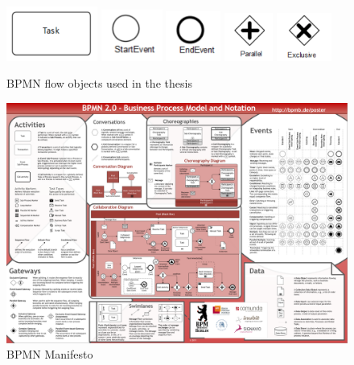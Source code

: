 \begin{figure}[!ht]
    \centering
    \includegraphics[width=30mm]{images/bpmn_task.png}
    \includegraphics[width=20mm]{images/bpmn_start_event.png}
    \includegraphics[width=18mm]{images/bpmn_end_event.png}
    \includegraphics[width=16mm]{images/bpmn_parallel.png}
    \includegraphics[width=18mm]{images/bpmn_exclusive.png}
    \caption{BPMN flow objects used in the thesis}
    \label{images:bpmn_flow_obj}
\end{figure}


\begin{figure}[!ht]
    \centering
\includegraphics[width=\textwidth]{images/bpmn_manifesto.png}
    \caption{BPMN Manifesto}
    \label{images:bpmn_manifesto}
\end{figure}

